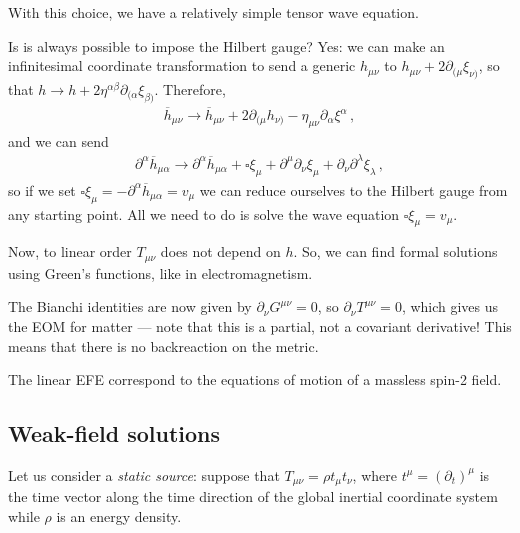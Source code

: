 \documentclass[main.tex]{subfiles}
\begin{document}
With this choice, we have 
%
%
a relatively simple tensor wave equation. 

Is is always possible to impose the Hilbert gauge? Yes: we can make an infinitesimal coordinate transformation to send a generic \(h_{\mu \nu }\) to \(h_{\mu \nu } + 2 \partial_{(\mu  } \xi_{\nu )}\), so that \(h \to h + 2 \eta^{\alpha \beta } \partial_{(\alpha } \xi_{\beta) }\). 
Therefore, 
%
\begin{align}
\overline{h}_{\mu \nu } \to \overline{h}_{\mu \nu } + 2 \partial_{(\mu } h_{\nu )} - \eta_{\mu \nu } \partial_{\alpha } \xi^{\alpha }
\,,
\end{align}
%
and we can send 
%
\begin{align}
\partial^{\alpha } \overline{h}_{\mu \alpha } \to \partial^{\alpha } \overline{h}_{\mu \alpha } + \square \xi_{\mu } + \partial^{\mu } \partial_{\nu } \xi_{\mu } + \partial_{\nu } \partial^{\lambda } \xi_{\lambda } 
\,,
\end{align}
%
so if we set \(\square \xi_{\mu } = - \partial^{\alpha } \overline{h}_{\mu \alpha } = v_\mu \) we can reduce ourselves to the Hilbert gauge from any starting point. 
All we need to do is solve the wave equation \(\square \xi_{\mu } = v_\mu \).

Now, to linear order \(T_{\mu \nu }\) does not depend on \(h\). 
So, we can find formal solutions using Green's functions, like in electromagnetism. 

The Bianchi identities are now given by \(\partial_{\nu } G^{\mu \nu } = 0\), so \(\partial_{\nu } T^{\mu \nu } = 0\), which gives us the EOM for matter --- note that this is a partial, not a covariant derivative! This means that there is no backreaction on the metric.

The linear EFE correspond to the equations of motion of a massless spin-2 field. 

\subsection{Weak-field solutions} 

Let us consider a \emph{static source}: suppose that \(T_{\mu \nu } = \rho t_\mu t_\nu \), where \(t^{\mu } = (\partial_{t})^{\mu }\) is the time vector along the time direction of the global inertial coordinate system while \(\rho \) is an energy density.
\end{document}
